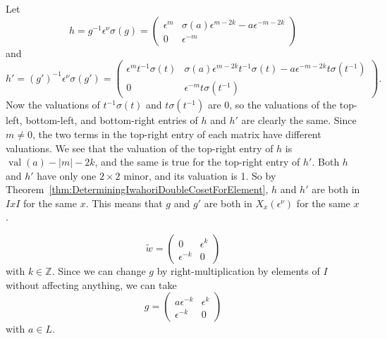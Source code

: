 \documentclass{amsart}
\theoremstyle{definition}
\def\e{\epsilon}
\def\w{\widetilde{w}}
\def\val{\mathop{\mathrm{val}}}
\def\s{\sigma}
\def\en{\e^{\nu}}
\def\X{X_x(\en)}
\def\Z{\mathbb{Z}}
\newenvironment{caselist}
	       {\begin{list}{\underline{Case \arabic{enumi}}:}
		   {\usecounter{enumi}
		     \setlength{\itemindent}{0.5in}
		     \setlength{\leftmargin}{0in}
		     \setlength{\rightmargin}{0in}
	       }}
	       {\end{list}}
\begin{document}
\begin{caselist}
      Let
      \begin{equation*}
	h = g^{-1}\en \s(g) =
	\begin{pmatrix}
	  \e^m & \s(a)\e^{m-2k} - a \e^{-m-2k} \\
	  0 & \e^{-m}
      	\end{pmatrix}
      \end{equation*}
      and 
      \begin{equation*}
	h' = (g')^{-1}\en \s(g') = 
	\begin{pmatrix}
	  \e^m t^{-1}\s(t) & \s(a)\e^{m-2k}t^{-1}\s(t) - a \e^{-m-2k}
	  t\s(t^{-1}) \\
	  0 & \e^{-m}t\s(t^{-1})
	\end{pmatrix}.
      \end{equation*}
      Now the valuations of $t^{-1}\s(t)$ and $t\s(t^{-1})$ are 0, so the
      valuations of the top-left, bottom-left, and bottom-right entries of $h$
      and $h'$ are clearly the same.  Since $m \neq 0$, the two terms in the
      top-right entry of each matrix have different valuations.  We see that
      the valuation of the top-right entry of $h$ is $\val(a) - |m| - 2k$, and
      the same is true for the top-right entry of $h'$.  Both $h$ and $h'$ have
      only one $2 \times 2$ minor, and its valuation is 1.  So by
      Theorem~\ref{thm:DeterminingIwahoriDoubleCosetForElement}, $h$ and $h'$
      are both in $IxI$ for the same $x$.  This means that $g$ and $g'$ are
      both in $\X$ for the same $x$.
    \item
      \begin{equation*}
	\w = \begin{pmatrix} 0 & \e^k \\ \e^{-k} & 0 \end{pmatrix}
      \end{equation*}
      with $k \in \Z$.  Since we can change $g$ by right-multiplication
      by elements of $I$ without affecting anything, we can take
      \begin{equation*}
	g = \begin{pmatrix} a\e^{-k} & \e^k \\ \e^{-k} & 0 \end{pmatrix}
      \end{equation*}
      with $a \in L$.


\end{caselist}
\end{document}
